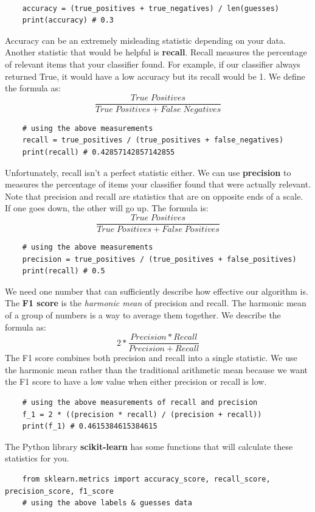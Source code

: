 \documentclass[11pt, a4paper]{article}
\begin{document}
\begin{spacing}{1.1}
	\begin{lstlisting}
	
	accuracy = (true_positives + true_negatives) / len(guesses)
	print(accuracy) # 0.3 \end{lstlisting} \vspace*{2mm}
	Accuracy can be an extremely misleading statistic depending on your data. Another statistic that would be helpful is \textbf{recall}. Recall measures the percentage of relevant items that your classifier found. For example, if our classifier always returned True, it would have a low accuracy but its recall would be 1. We define the formula as: $$ \frac{True\; Positives}{True\; Positives + False\; Negatives} $$ 
	\begin{lstlisting}
	# using the above measurements
	recall = true_positives / (true_positives + false_negatives)
	print(recall) # 0.42857142857142855 \end{lstlisting} \vspace*{2mm}
	Unfortunately, recall isn’t a perfect statistic either. We can use \textbf{precision} to measures the percentage of items your classifier found that were actually relevant. Note that precision and recall are statistics that are on opposite ends of a scale. If one goes down, the other will go up. The formula is: $$ \frac{True\; Positives}{True\; Positives + False\; Positives} $$
	\begin{lstlisting}
	# using the above measurements
	precision = true_positives / (true_positives + false_positives)
	print(recall) # 0.5 \end{lstlisting} \vspace*{2mm} 
	We need one number that can sufficiently describe how effective our algorithm is. The \textbf{F1 score} is the \textit{harmonic mean} of precision and recall. The harmonic mean of a group of numbers is a way to average them together. We describe the formula as: $$ 2 * \frac{Precision * Recall}{Precision + Recall} $$
	The F1 score combines both precision and recall into a single statistic. We use the harmonic mean rather than the traditional arithmetic mean because we want the F1 score to have a low value when either precision or recall is low. 
	\begin{lstlisting}
	# using the above measurements of recall and precision
	f_1 = 2 * ((precision * recall) / (precision + recall))
	print(f_1) # 0.4615384615384615	\end{lstlisting} \vspace*{2mm} 
	The Python library \textbf{scikit-learn} has some functions that will calculate these statistics for you.
	\begin{lstlisting}
	from sklearn.metrics import accuracy_score, recall_score, precision_score, f1_score
	# using the above labels & guesses data
	

\end{lstlisting}
\end{spacing}
\end{document}
